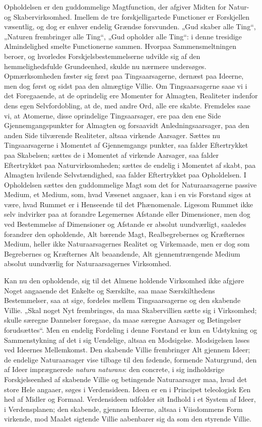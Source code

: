 \documentclass[12pt]{book}
\begin{document}
Opholdelsen er den guddommelige Magtfunction, der afgiver Midten for
Natur- og Skabervirksomhed. Imellem de tre forskjelligartede
Functioner er Forskjellen væsentlig, og dog er enhver endelig
Grændse forsvunden. „Gud skaber alle Ting“, „Naturen frembringer
alle Ting“, „Gud opholder alle Ting“: i denne tresidige
Almindelighed smelte Functionerne sammen. Hvorpaa Sammensmeltningen
beroer, og hvorledes Forskjelsbestemmelserne udvikle sig af den
hemmelighedsfulde Grundeenhed, skulde nu nærmere undersøges.
Opmærksomheden fæster sig først paa Tingsaarsagerne, dernæst paa
Ideerne, men dog først og sidst paa den almægtige Villie. Om
Tingsaarsagerne saae vi i det Foregaaende, at de oprindelig ere
Momenter for Almagten, Realiteter indenfor dens egen Selvfordobling,
at de, med andre Ord, alle ere skabte. Fremdeles saae vi, at
Atomerne, disse oprindelige Tingsaarsager, ere paa den ene Side
Gjennemgangspunkter for Almagten og forsaavidt Anledningsaarsager,
paa den anden Side tilværende Realiteter, altsaa virkende Aarsager.
Sættes nu Tingsaarsagerne i Momentet af Gjennemgangs\-
punkter, saa falder Eftertrykket paa Skabelsen; sættes de i Momentet
af virkende Aarsager, saa falder Eftertrykket paa
Naturvirksomheden; sættes de endelig i Momentet af skabt, paa
Almagten hvilende Selvstændighed, saa falder Eftertrykket paa
Opholdelsen. I Opholdelsen sættes den guddommelige Magt som det for
Naturaarsagerne passive Medium, et Medium, som, hvad Væsenet
angaaer, kan i en vis Forstand siges at være, hvad Rummet er i
Henseende til det Phænomenale. Ligesom Rummet ikke selv indvirker
paa at forandre Legemernes Afstande eller Dimensioner, men dog ved
Bestemmelse af Dimensioner og Afstande er absolut uundværligt,
saaledes forandrer den opholdende, Alt bærende Magt,
Realbegrebernes og Kræfternes Medium, heller ikke Naturaarsagernes
Realitet og Virkemaade, men er dog som Begrebernes og Kræfternes Alt
beaandende, Alt gjennemtrængende Medium absolut uundværlig for
Naturaarsagernes Virksomhed.

Kan nu den opholdende, sig til det Almene holdende Virksomhed ikke
afgjøre Noget angaaende det Enkelte og Særskilte, saa maae
Særskilthedens Bestemmelser, saa at sige, fordeles mellem
Tingsaarsagerne og den skabende Villie. „Skal noget Nyt
frembringes, da maa Skabervillien sætte sig i Virksomhed; skulle
særegne Dannelser foregaae, da maae særegne Aarsager og Betingelser
forudsættes“. Men en endelig Fordeling i denne Forstand er kun en
Udstykning og Sammenstykning af det i sig Uendelige, altsaa en
Modsigelse. Modsigelsen løses ved Ideernes Mellemkomst. Den skabende
Villie frembringer Alt gjennem Ideer; de endelige Naturaarsager vise
tilbage til den fødende, formende Naturgrund, den af Ideer
imprægnerede \textit{natura naturans}: den concrete, i sig
indholdsrige Forskjelseenhed af skabende Villie og betingende
Naturaarsager maa, hvad det store Hele angaaer, søges i
Verdensideen. Ideen er en i Principet teleologisk Een\-
hed af Midler og Formaal. Verdensideen udfolder sit Indhold i et
System af Ideer, i Verdensplanen; den skabende, gjennem Ideerne,
altsaa i Viisdommens Form virkende, mod Maalet sigtende Villie
aabenbarer sig da som den styrende Villie.
\end{document}
